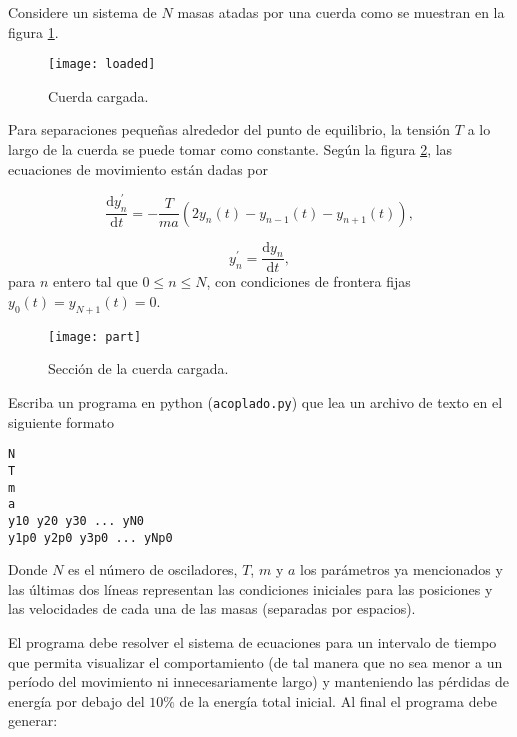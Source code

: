 \documentclass[11pt,letterpaper]{exam}
\begin{document}
\begin{questions}

Considere un sistema de $N$ masas atadas por una cuerda como se muestran en la figura \ref{fig:loaded}.

\begin{figure}[H]
  \centering
  \texttt{[image: loaded]}
  \caption{\label{fig:loaded} Cuerda cargada.}
\end{figure}

Para separaciones peque\~nas alrededor del punto de equilibrio, la tensi\'on $T$ a lo largo de la cuerda se puede tomar como constante. Seg\'un la figura \ref{fig:part}, las ecuaciones de movimiento est\'an dadas por

\begin{equation*}
\frac{\mathrm{d}y_n^\prime}{\mathrm{d}t} = -\frac{T}{ma}\left(2y_n(t) -y_{n-1}(t) - y_{n+1}(t)\right),
\end{equation*}

\begin{equation*}
y_n^\prime  = \frac{\mathrm{d} y_n}{\mathrm{d} t},
\end{equation*}
%
para $n$ entero tal que $0\leq n\leq N$, con condiciones de frontera fijas $y_0(t) = y_{N+1}(t) = 0$.

\begin{figure}[H]
  \centering
  \texttt{[image: part]}
  \caption{\label{fig:part} Secci\'on de la cuerda cargada.}
\end{figure}


Escriba un programa en python (\verb"acoplado.py") que lea un archivo
de texto en el siguiente formato 
\vspace{0.5cm}
\begin{verbatim}
N
T
m
a
y10 y20 y30 ... yN0
y1p0 y2p0 y3p0 ... yNp0
\end{verbatim}
\vspace{0.5cm}
Donde $N$ es el n\'umero de osciladores, $T$, $m$ y $a$ los par\'ametros ya mencionados y las \'ultimas dos l\'ineas representan las condiciones iniciales para las posiciones y las velocidades de cada una de las masas (separadas por espacios).

El programa debe resolver el sistema de ecuaciones para un intervalo
de tiempo que permita visualizar el comportamiento (de tal manera que
no sea menor a un per\'iodo del movimiento ni innecesariamente largo)
y manteniendo las p\'erdidas de energ\'ia por debajo del $10\%$ de la
energ\'ia total inicial.
Al final el programa debe generar:


\end{questions}
\end{document}
